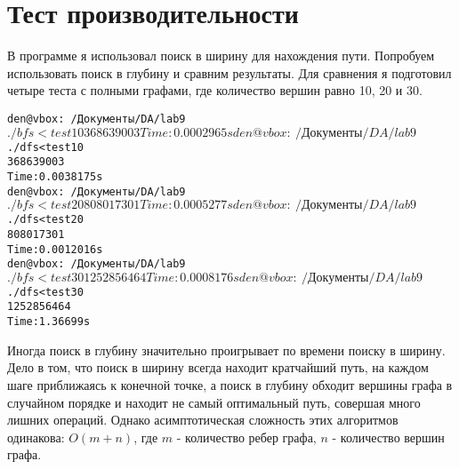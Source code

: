 \section{Тест производительности}

В программе я использовал поиск в ширину для нахождения пути. Попробуем использовать поиск в глубину и сравним результаты.
Для сравнения я подготовил четыре теста с полными графами, где количество вершин равно 10, 20 и 30.

\begin{alltt}
den@vbox:~/Документы/DA/lab9$ ./bfs <test10
368639003
Time: 0.0002965 s
den@vbox:~/Документы/DA/lab9$ ./dfs <test10
368639003
Time: 0.0038175 s
den@vbox:~/Документы/DA/lab9$ ./bfs <test20
808017301
Time: 0.0005277 s
den@vbox:~/Документы/DA/lab9$ ./dfs <test20
808017301
Time: 0.0012016 s
den@vbox:~/Документы/DA/lab9$ ./bfs <test30
1252856464
Time: 0.0008176 s
den@vbox:~/Документы/DA/lab9$ ./dfs <test30
1252856464
Time: 1.36699 s
\end{alltt}

Иногда поиск в глубину значительно проигрывает по времени поиску в ширину. Дело в том, что поиск в ширину всегда находит кратчайший путь, 
на каждом шаге приближаясь к конечной точке, а поиск в глубину обходит вершины графа в случайном порядке и находит не самый оптимальный путь, совершая много лишних операций.
Однако асимптотическая сложность этих алгоритмов одинакова: $O(m + n)$, где $m$ - количество ребер графа, $n$ - количество вершин графа.

\pagebreak
